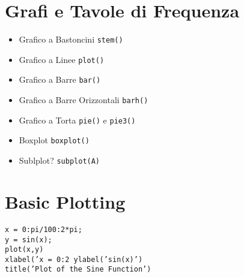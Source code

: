 \documentclass{article}
\begin{document}
\section{Grafi e Tavole di Frequenza}
\begin{itemize}
    \item Grafico a Bastoncini
    \subitem \texttt{stem()}
    \item Grafico a Linee
    \subitem \texttt{plot()}
    \item Grafico a Barre
    \subitem \texttt{bar()}
    \item Grafico a Barre Orizzontali
    \subitem \texttt{barh()}
    \item Grafico a Torta
    \subitem \texttt{pie()} e \texttt{pie3()}
    \item Boxplot
    \subitem \texttt{boxplot()}
    \item Sublplot?
    \subitem \texttt{subplot(A)}
\end{itemize}

\section{Basic Plotting}
\texttt{x = 0:pi/100:2*pi;\\
y = sin(x);\\
plot(x,y)\\
xlabel('x = 0:2 %
ylabel('sin(x)')\\
title('Plot of the Sine Function')}
\end{document}
